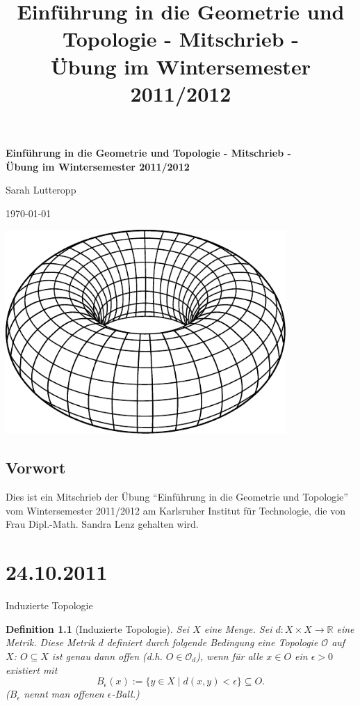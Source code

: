 \documentclass[a4paper,11pt,notitlepage]{report}
\title{\textbf{{Einführung in die Geometrie und Topologie - Mitschrieb -} \\[5ex] 
    {\Large Übung im Wintersemester 2011/2012\\[5ex]}}}
\author{\myname{Sarah Lutteropp}}
\newtheorem{definition}{Definition}[chapter]
\newcommand{\R}{{\ensuremath{\mathbb{R}}}}
\newcommand{\OO}{{\ensuremath{\mathcal{O}}}}
\begin{document}
\begin{titlepage}
	\begin{center}	
		\LARGE \textbf{{Einführung in die Geometrie und Topologie - Mitschrieb -} \\[5ex] 
    		{\Large Übung im Wintersemester 2011/2012\\[5ex]}}
	\end{center}
	\begin{center}
		\Large Sarah Lutteropp
	\end{center}
	\begin{center}
		\today
	\end{center}
	\vspace{2cm}
	\begin{center}
		\includegraphics[width=0.8\textwidth]{torus2.pdf}
	\end{center}
\end{titlepage}
\setcounter{tocdepth}{1}
\tableofcontents

\section*{Vorwort}
Dies ist ein Mitschrieb der Übung “Einführung in die Geometrie und Topologie” vom Wintersemester 2011/2012 am Karlsruher Institut für Technologie, die von Frau Dipl.-Math. Sandra Lenz gehalten wird.

\chapter{24.10.2011}

\begin{section}{Induzierte Topologie}
	\begin{definition}[Induzierte Topologie]
		Sei $X$ eine Menge. Sei $d \colon X \times X \rightarrow \R$ eine Metrik. Diese Metrik $d$ definiert durch folgende Bedingung eine Topologie $\OO$ auf $X$:
		\newline
		$O \subseteq X$ ist genau dann offen (d.h. $O \in \OO_d$), wenn für alle $x \in O$ ein $\epsilon > 0$ existiert mit
		$$
			B_\epsilon (x) := \{y \in X \mid d(x,y) < \epsilon\} \subseteq O.
		$$
		($B_\epsilon$ nennt man offenen $\epsilon$-Ball.)
	\end{definition}
\end{section}
\end{document}
